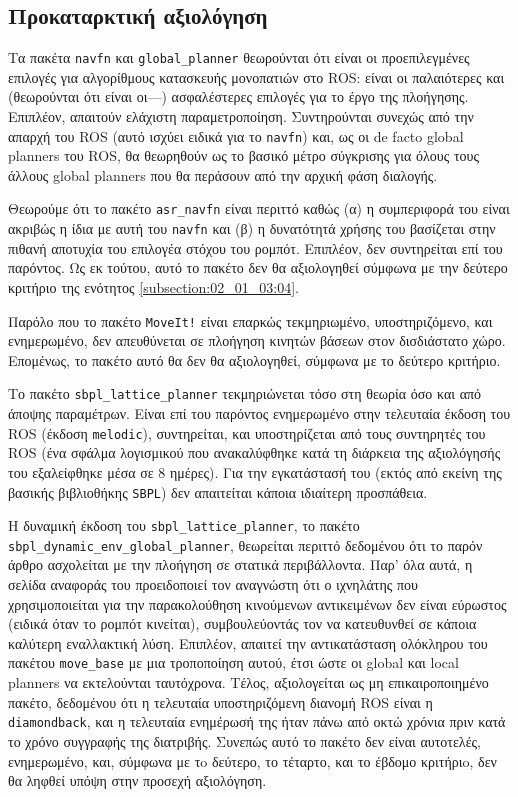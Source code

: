 \subsection{Προκαταρκτική αξιολόγηση}
  \label{subsection:02_01_04:01}

Τα πακέτα \texttt{navfn} και \texttt{global\_planner} θεωρούνται ότι είναι οι
προεπιλεγμένες επιλογές για αλγορίθμους κατασκευής μονοπατιών στο ROS: είναι οι
παλαιότερες και (θεωρούνται ότι είναι οι---) ασφαλέστερες επιλογές για το έργο
της πλοήγησης. Επιπλέον, απαιτούν ελάχιστη παραμετροποίηση. Συντηρούνται συνεχώς
από την απαρχή του ROS (αυτό ισχύει ειδικά για το \texttt{navfn}) και,
ως οι de facto global planners του ROS, θα θεωρηθούν ως το βασικό μέτρο
σύγκρισης για όλους τους άλλους global planners που θα περάσουν από την αρχική
φάση διαλογής.

Θεωρούμε ότι το πακέτο \texttt{asr\_navfn} είναι περιττό καθώς (α) η
συμπεριφορά του είναι ακριβώς η ίδια με αυτή του \texttt{navfn} και (β) η
δυνατότητά χρήσης του βασίζεται στην πιθανή αποτυχία του επιλογέα στόχου του
ρομπότ. Επιπλέον, δεν συντηρείται επί του παρόντος. Ως εκ τούτου, αυτό το
πακέτο δεν θα αξιολογηθεί σύμφωνα με την δεύτερο κριτήριο της ενότητος
\ref{subsection:02_01_03:04}.

Παρόλο που το πακέτο \texttt{MoveIt!} είναι επαρκώς τεκμηριωμένο,
υποστηριζόμενο, και ενημερωμένο, δεν απευθύνεται σε πλοήγηση κινητών βάσεων
στον δισδιάστατο χώρο. Επομένως, το πακέτο αυτό θα δεν θα αξιολογηθεί, σύμφωνα
με το δεύτερο κριτήριο.

Το πακέτο \texttt{sbpl\_lattice\_planner} τεκμηριώνεται τόσο στη θεωρία όσο και
από άποψης παραμέτρων. Είναι επί του παρόντος ενημερωμένο στην τελευταία έκδοση
του ROS (έκδοση \texttt{melodic}), συντηρείται, και υποστηρίζεται από τους
συντηρητές του ROS (ένα σφάλμα λογισμικού που ανακαλύφθηκε κατά τη διάρκεια της
αξιολόγησής του εξαλείφθηκε μέσα σε $8$ ημέρες). Για την εγκατάστασή του
(εκτός από εκείνη της βασικής βιβλιοθήκης \texttt{SBPL}) δεν απαιτείται κάποια
ιδιαίτερη προσπάθεια.

Η δυναμική έκδοση του \texttt{sbpl\_lattice\_planner}, το πακέτο
\texttt{sbpl\_dynamic\_env\_global\_planner}, θεωρείται περιττό δεδομένου ότι το
παρόν άρθρο ασχολείται με την πλοήγηση σε στατικά περιβάλλοντα.  Παρ' όλα αυτά,
η σελίδα αναφοράς του προειδοποιεί τον αναγνώστη ότι ο ιχνηλάτης που
χρησιμοποιείται για την παρακολούθηση κινούμενων αντικειμένων δεν είναι
εύρωστος (ειδικά όταν το ρομπότ κινείται), συμβουλεύοντάς τον να κατευθυνθεί σε
κάποια καλύτερη εναλλακτική λύση. Επιπλέον, απαιτεί την αντικατάσταση ολόκληρου
του πακέτου \texttt{move\_base} με μια τροποποίηση αυτού, έτσι ώστε οι global
και local planners να εκτελούνται ταυτόχρονα. Τέλος, αξιολογείται ως μη
επικαιροποιημένο πακέτο, δεδομένου ότι η τελευταία υποστηριζόμενη διανομή ROS
είναι η \texttt{diamondback}, και η τελευταία ενημέρωσή της ήταν πάνω από οκτώ
χρόνια πριν κατά το χρόνο συγγραφής της διατριβής. Συνεπώς αυτό το πακέτο δεν
είναι αυτοτελές, ενημερωμένο, και, σύμφωνα με τo δεύτερο, το τέταρτο, και το
έβδομο κριτήριo, δεν θα ληφθεί υπόψη στην προσεχή αξιολόγηση.

